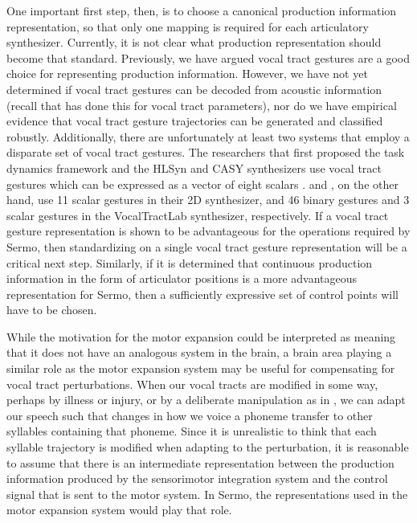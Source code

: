 One important first step, then,
is to choose a canonical
production information representation,
so that only one mapping is required
for each articulatory synthesizer.
Currently, it is not clear
what production representation
should become that standard.
Previously, we have argued
vocal tract gestures are a
good choice for representing production information.
However, we have not yet determined
if vocal tract gestures can be decoded
from acoustic information
(recall that \citealt{uria2011}
has done this for vocal tract parameters),
nor do we have empirical evidence
that vocal tract gesture trajectories
can be generated and classified robustly.
Additionally, there are unfortunately
at least two systems that employ
a disparate set of vocal tract gestures.
The researchers that first proposed
the task dynamics framework
and the HLSyn \citep{hanson1999}
and CASY synthesizers \citep{iskarous2003}
use vocal tract gestures
which can be expressed
as a vector of eight scalars
\citep{zhuang2008,zhuang2009}.
\citet{kroger2014} and \citet{birkholz2006,birkholz2013},
on the other hand,
use 11 scalar gestures in their 2D synthesizer,
and 46 binary gestures and 3 scalar gestures
in the VocalTractLab synthesizer,
respectively.
If a vocal tract gesture representation
is shown to be advantageous
for the operations required by Sermo,
then standardizing on a single
vocal tract gesture representation
will be a critical next step.
Similarly,
if it is determined that
continuous production information
in the form of articulator positions
is a more advantageous representation
for Sermo,
then a sufficiently expressive
set of control points
will have to be chosen.

While the motivation for the
motor expansion could be interpreted
as meaning that it does not
have an analogous system in the brain,
a brain area playing a similar role
as the motor expansion system
may be useful for
compensating for vocal tract perturbations.
When our vocal tracts are modified in some way,
perhaps by illness or injury,
or by a deliberate manipulation
as in \citet{houde1998},
we can adapt our speech
such that changes in how we voice a phoneme
transfer to other syllables containing that phoneme.
Since it is unrealistic to think that
each syllable trajectory is modified
when adapting to the perturbation,
it is reasonable to assume that
there is an intermediate representation
between the production information
produced by the sensorimotor integration system
and the control signal that is sent
to the motor system.
In Sermo, the representations used
in the motor expansion system
would play that role.

